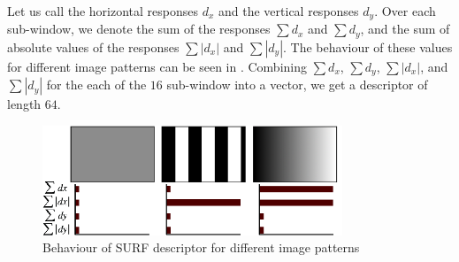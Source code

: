 Let us call the horizontal responses $d_x$ and the vertical responses $d_y$. Over each sub-window, we denote the sum of the responses $\sum d_x$ and $\sum d_y$, and the sum of absolute values of the responses $\sum |d_x|$ and $\sum |d_y|$. The behaviour of these values for different image patterns can be seen in . Combining $\sum d_x$, $\sum d_y$, $\sum |d_x|$, and $\sum |d_y|$ for the each of the $16$ sub-window into a vector, we get a descriptor of length $64$.

\begin{figure}
    \centering
    \includegraphics[width=0.8\textwidth]{Figures/surf/surf_descriptor.png}
    \caption[Behaviour of SURF descriptor for different image patterns]{Behaviour of SURF descriptor for different image patterns\cite{Bay2006}}
    \label{fig:surf_descriptor}
\end{figure}
